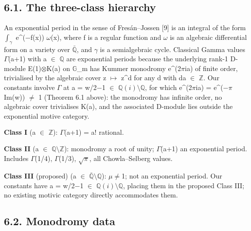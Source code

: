 \documentclass[11pt]{article}
\begin{document}
\hypertarget{the-three-class-hierarchy}{%
\subsection{6.1. The three-class
hierarchy}\label{the-three-class-hierarchy}}

An exponential period in the sense of Fresán--Jossen {[}9{]} is an
integral of the form \(\int_\gamma\) e\^{}(−f(x)) \(\omega\)(x), where f
is a regular function and \(\omega\) is an algebraic differential form
on a variety over \(\bar{\mathbb{Q}}\), and \(\gamma\) is a
semialgebraic cycle. Classical Gamma values \(\Gamma\)(a+1) with a
\(\in\) \(\mathbb{Q}\) are exponential periods because the underlying
rank-1 D-module E(1)\(\otimes\)K(a) on \(\mathbb{G}\)\_m has Kummer
monodromy e\^{}(2\(\pi\)ia) of finite order, trivialised by the
algebraic cover z \(\mapsto\) z\^{}d for any d with da \(\in\)
\(\mathbb{Z}\). Our constants involve \(\Gamma\) at a = w/2−1 \(\in\)
\(\mathbb{Q}(i)\setminus \mathbb{Q}\), for which
\textbar e\^{}(2\(\pi\)ia)\textbar{} = e\^{}(−\(\pi\) Im(w)) \(\neq\) 1
(Theorem 6.1 above): the monodromy has infinite order, no algebraic
cover trivialises K(a), and the associated D-module lies outside the
exponential motive category.

\textbf{Class I} (a \(\in\) \(\mathbb{Z}\)): \(\Gamma\)(a+1) = a!
rational.

\textbf{Class II} (a \(\in\) \(\mathbb{Q}\setminus \mathbb{Z}\)):
monodromy a root of unity; \(\Gamma\)(a+1) an exponential period.
Includes \(\Gamma\)(1/4), \(\Gamma\)(1/3), \(\sqrt{\pi}\), all
Chowla--Selberg values.

\textbf{Class III} (proposed) (a \(\in\)
\(\bar{\mathbb{Q}}\setminus \mathbb{Q}\)):
\textbar{}\(\mu\)\textbar{}\(\neq\)1; not an exponential period. Our
constants have a = w/2−1 \(\in\) \(\mathbb{Q}(i)\setminus \mathbb{Q}\),
placing them in the proposed Class III; no existing motivic category
directly accommodates them.

\hypertarget{monodromy-data}{%
\subsection{6.2. Monodromy data}\label{monodromy-data}}
\end{document}
